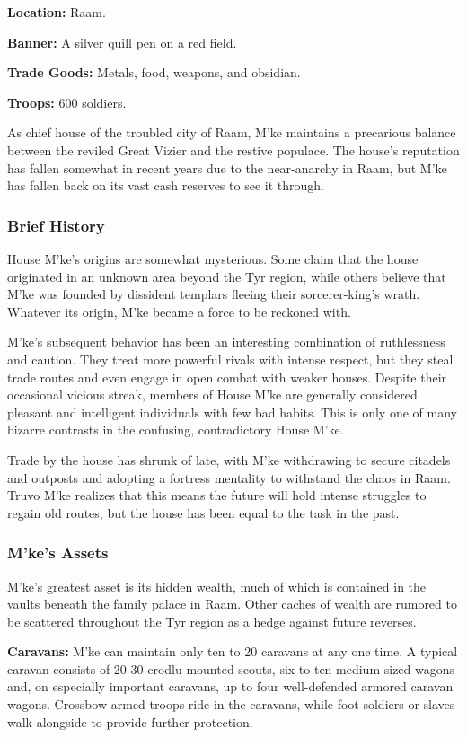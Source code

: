 \textbf{Location:} Raam.

\textbf{Banner:} A silver quill pen on a red field.

\textbf{Trade Goods:} Metals, food, weapons, and obsidian.

\textbf{Troops:} 600 soldiers.

As chief house of the troubled city of Raam, M'ke maintains a precarious balance between the reviled Great Vizier and the restive populace. The house's reputation has fallen somewhat in recent years due to the near-anarchy in Raam, but M'ke has fallen back on its vast cash reserves to see it through.

\subsubsection{Brief History}
House M'ke's origins are somewhat mysterious. Some claim that the house originated in an unknown area beyond the Tyr region, while others believe that M'ke was founded by dissident templars fleeing their sorcerer-king's wrath. Whatever its origin, M'ke became a force to be reckoned with.

M'ke's subsequent behavior has been an interesting combination of ruthlessness and caution. They treat more powerful rivals with intense respect, but they steal trade routes and even engage in open combat with weaker houses. Despite their occasional vicious streak, members of House M'ke are generally considered pleasant and intelligent individuals with few bad habits. This is only one of many bizarre contrasts in the confusing, contradictory House M'ke.

Trade by the house has shrunk of late, with M'ke withdrawing to secure citadels and outposts and adopting a fortress mentality to withstand the chaos in Raam. Truvo M'ke realizes that this means the future will hold intense struggles to regain old routes, but the house has been equal to the task in the past.

\subsubsection{M'ke's Assets}
M'ke's greatest asset is its hidden wealth, much of which is contained in the vaults beneath the family palace in Raam. Other caches of wealth are rumored to be scattered throughout the Tyr region as a hedge against future reverses.

\textbf{Caravans:} M'ke can maintain only ten to 20 caravans at any one time. A typical caravan consists of 20-30 crodlu-mounted scouts, six to ten medium-sized wagons and, on especially important caravans, up to four well-defended armored caravan wagons. Crossbow-armed troops ride in the caravans, while foot soldiers or slaves walk alongside to provide further protection.

